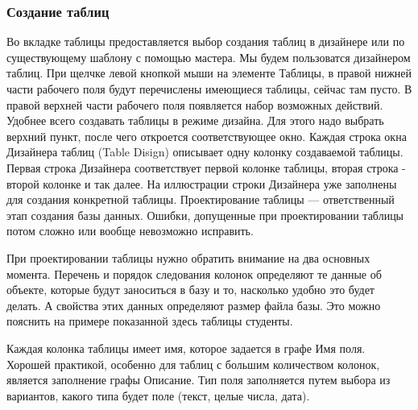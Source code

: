\documentclass[a4paper]{article}
\begin{document}
\subsubsection{Создание таблиц}

Во вкладке таблицы предоставляется выбор создания таблиц в дизайнере или по существующему шаблону с помощью мастера. Мы будем пользоватся дизайнером таблиц. При щелчке левой кнопкой мыши на элементе Таблицы, в правой нижней части рабочего поля будут перечислены имеющиеся таблицы, сейчас там пусто. В правой верхней части рабочего поля появляется набор возможных действий. Удобнее всего создавать таблицы в режиме дизайна. Для этого надо выбрать верхний пункт, после чего откроется соответствующее окно. Каждая строка окна Дизайнера таблиц (Table Disign) описывает одну колонку создаваемой таблицы. Первая строка Дизайнера соответствует первой колонке таблицы, вторая строка - второй колонке и так далее. На иллюстрации строки Дизайнера уже заполнены для создания конкретной таблицы. Проектирование таблицы --- ответственный этап создания базы данных. Ошибки, допущенные при проектировании таблицы потом сложно или вообще невозможно исправить.

При проектировании таблицы нужно обратить внимание на два основных момента. Перечень и порядок следования колонок определяют те данные об объекте, которые будут заноситься в базу и то, насколько удобно это будет делать. А свойства этих данных определяют размер файла базы. Это можно пояснить на примере показанной здесь таблицы студенты.

\begin{figure}[h]
\end{figure}

Каждая колонка таблицы имеет имя, которое задается в графе Имя поля. Хорошей практикой, особенно для таблиц с большим количеством колонок, является заполнение графы Описание. Тип поля заполняется путем выбора из вариантов, какого типа будет поле (текст, целые числа, дата).
\end{document}
